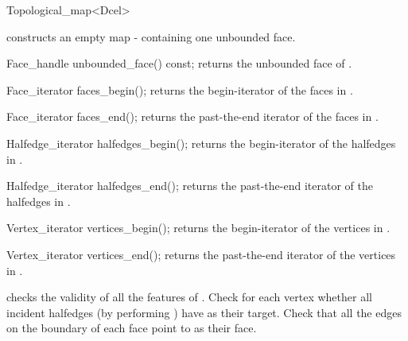 \begin{ccRefClass}{Topological_map<Dcel>}
    \ccGlue
    \ccGlue    
    \ccGlue    
    
\ccCreation
    
     {constructs an
       empty map - containing one unbounded face.}

    
\ccAccessFunctions

    \ccMethod
    {Face_handle  unbounded_face() const;}
    {returns the unbounded face of \ccVar .}
  
    \ccMethod
    { Face_iterator faces_begin(); }
    { returns the begin-iterator of the faces in \ccVar .}
    
    \ccMethod
    { Face_iterator faces_end(); }
    { returns the past-the-end iterator of the faces in \ccVar .}
    
    \ccMethod
    { Halfedge_iterator halfedges_begin(); }
    { returns the begin-iterator of the halfedges in \ccVar .}
 
    \ccMethod
    { Halfedge_iterator halfedges_end(); }
    { returns the past-the-end iterator of the halfedges in \ccVar .}
    
    \ccMethod
    { Vertex_iterator vertices_begin(); }
    { returns the begin-iterator of the vertices in \ccVar .}
    
    \ccMethod
    { Vertex_iterator vertices_end(); }
    { returns the past-the-end iterator of the vertices in \ccVar .}

\ccPredicates
    
     { checks the validity of all the
       features of \ccVar . Check for each vertex 
       whether all incident halfedges (by performing
       ) have  as their
       target. 
       Check that all the edges on the boundary
       of each face  point to  as their
       face.} 


\end{ccRefClass}
